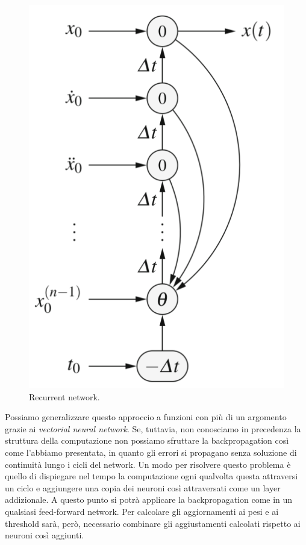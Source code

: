 \documentclass[10pt,a4paper]{article}
\begin{document}
\begin{figure}
\centering
\includegraphics[scale=0.3]{img/recurrent.png}
\caption{Recurrent network.}
\label{fig:22}
\end{figure}

Possiamo generalizzare questo approccio a funzioni con più di un argomento grazie ai \emph{vectorial neural network}. Se, tuttavia, non conosciamo in precedenza la struttura della computazione non possiamo sfruttare la backpropagation così come l'abbiamo presentata, in quanto gli errori si propagano senza soluzione di continuità lungo i cicli del network. Un modo per risolvere questo problema è quello di dispiegare nel tempo la computazione ogni qualvolta questa attraversi un ciclo e aggiungere una copia dei neuroni così attraversati come un layer addizionale. A questo punto si potrà applicare la backpropagation come in un qualsiasi feed-forward network. Per calcolare gli aggiornamenti ai pesi e ai threshold sarà, però, necessario combinare gli aggiustamenti calcolati rispetto ai neuroni così aggiunti. 
 
\end{document}
